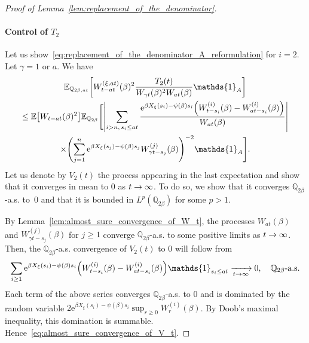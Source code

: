 \documentclass[10pt]{amsart}
\theoremstyle{definition}\newtheorem{defi}[theo]{Definition}\newtheorem{rema}[theo]{Remark}\newtheorem{exam}[theo]{Example}\newtheorem{exem}[theo]{Example}\newtheorem{nota}[theo]{Notation}
\newcommand{\e}{\mathrm{e}}
\newcommand{\E}{\mathbb{E}}
\newcommand{\Q}{\mathbb{Q}}
\newcommand\1{\mathds{1}}
\let\originalleft\left
\let\originalright\right
\renewcommand{\left}{\mathopen{}\mathclose\bgroup\originalleft}
\renewcommand{\right}{\aftergroup\egroup\originalright}
\renewcommand*{\to}{\mathchoice{\longrightarrow}{\rightarrow}{\rightarrow}{\rightarrow}}
\begin{document}
\begin{proof}[Proof of Lemma~\ref{lem:replacement_of_the_denominator}]
\paragraph*{Control of $T_2$} Let us show~\eqref{eq:replacement_of_the_denominator_A_reformulation} for $i = 2$. Let $\gamma = 1 \text{ or } a$. We have
\begin{multline*}
\E_{\Q_{2\beta, at}} \left[W_{t - at}^{(\xi, at)}(\beta)^2 \frac{T_2(t)}{W_{\gamma t}(\beta)^2 W_{at}(\beta)} \1_A \right]  \\
 \leq \E \left[W_{t - at}(\beta)^2 \right]\E_{\Q_{2\beta}} \Biggl[\left| \sum_{i > n,\, s_i \leq at} \frac{\e^{\beta X_\xi(s_i) - \psi(\beta)s_i} \left(W_{t - s_i}^{(i)}(\beta) - W_{at - s_i}^{(i)}(\beta)\right)}{W_{at}(\beta)} \right|  \\
\times \Biggl(\sum_{j = 1}^n \e^{\beta X_\xi(s_j) - \psi(\beta)s_j} W_{\gamma t - s_j}^{(j)}(\beta) \Biggr)^{-2} \1_A \Biggr]. 
\end{multline*}
Let us denote by $V_2(t)$ the process appearing in the last expectation and show that it converges in mean to $0$ as $t \to \infty$. To do so, we show that it converges $\Q_{2\beta}$-a.s. to~$0$ and that it is bounded in $L^p(\Q_{2\beta})$ for some $p > 1$.

By Lemma~\ref{lem:almost_sure_convergence_of_W_t}, the processes $W_{at}(\beta)$ and $W_{\gamma t - s_j}^{(j)}(\beta)$ for $j \geq 1$ converge $\Q_{2\beta}$-a.s. to some positive limits as $t \to \infty$. Then, the $\Q_{2\beta}$-a.s. convergence of $V_2(t)$ to $0$ will follow from
\begin{equation}\label{eq:almost_sure_convergence_of_V_t}
\sum_{i \geq 1} \e^{\beta X_\xi(s_i) - \psi(\beta)s_i} \left(W_{t - s_i}^{(i)}(\beta) - W_{at - s_i}^{(i)}(\beta)\right) \1_{s_i \leq at} \xrightarrow[t \to \infty]{} 0, \quad \text{$\Q_{2\beta}$-a.s.}
\end{equation}
Each term of the above series converges $\Q_{2\beta}$-a.s. to $0$ and is dominated by the random variable $2 \e^{\beta X_\xi(s_i) - \psi(\beta)s_i} \sup_{r \geq 0} W_r^{(i)}(\beta)$. By Doob's maximal inequality, this domination is summable. Hence~\eqref{eq:almost_sure_convergence_of_V_t}.


\end{proof}
\end{document}
